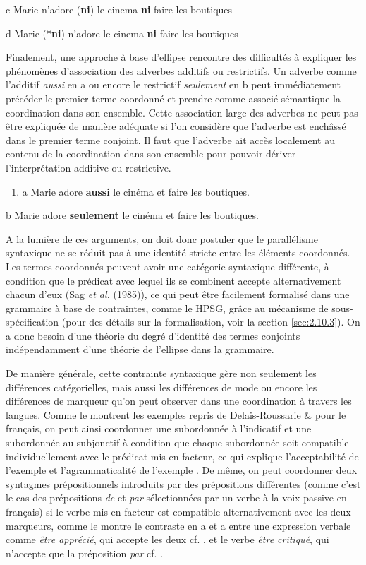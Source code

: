   c  Marie n'adore (\textbf{ni}) le cinema \textbf{ni} faire les boutiques

  d  Marie (*\textbf{ni}) n'adore le cinema \textbf{ni} faire les boutiques

Finalement, une approche à base d'ellipse rencontre des difficultés à expliquer les phénomènes d'association des adverbes additifs ou restrictifs. Un adverbe comme l'additif \textit{aussi} en a ou encore le restrictif \textit{seulement} en b peut immédiatement précéder le premier terme coordonné et prendre comme associé sémantique la coordination dans son ensemble. Cette association large des adverbes ne peut pas être expliquée de manière adéquate si l'on considère que l'adverbe est enchâssé dans le premier terme conjoint. Il faut que l'adverbe ait accès localement au contenu de la coordination dans son ensemble pour pouvoir dériver l'interprétation additive ou restrictive. 


\begin{enumerate}
\item \label{bkm:Ref300521332}a  Marie adore \textbf{aussi} le cinéma et faire les boutiques.


\end{enumerate}
  b  Marie adore \textbf{seulement} le cinéma et faire les boutiques.

A la lumière de ces arguments, on doit donc postuler que le parallélisme syntaxique ne se réduit pas à une identité stricte entre les éléments coordonnés. Les termes coordonnés peuvent avoir une catégorie syntaxique différente, à condition que le prédicat avec lequel ils se combinent accepte alternativement chacun d'eux (Sag \textit{et al.} (1985)), ce qui peut être facilement formalisé dans une grammaire à base de contraintes, comme le HPSG, grâce au mécanisme de sous-spécification (pour des détails sur la formalisation, voir la section \ref{sec:2.10.3}). On a donc besoin d'une théorie du degré d'identité des termes conjoints indépendamment d'une théorie de l'ellipse dans la grammaire.

De manière générale, cette contrainte syntaxique gère non seulement les différences catégorielles, mais aussi les différences de mode ou encore les différences de marqueur qu'on peut observer dans une coordination à travers les langues. Comme le montrent les exemples repris de Delais-Roussarie \& \citet{Mouret2008} pour le français, on peut ainsi coordonner une subordonnée à l'indicatif et une subordonnée au subjonctif à condition que chaque subordonnée soit compatible individuellement avec le prédicat mis en facteur, ce qui explique l'acceptabilité de l'exemple  et l'agrammaticalité de l'exemple . De même, on peut coordonner deux syntagmes prépositionnels introduits par des prépositions différentes (comme c'est le cas des prépositions \textit{de} et \textit{par} sélectionnées par un verbe à la voix passive en français) si le verbe mis en facteur est compatible alternativement avec les deux marqueurs, comme le montre le contraste en a et a entre une expression verbale comme \textit{être apprécié}, qui accepte les deux cf. , et le verbe \textit{être critiqué}, qui n'accepte que la préposition \textit{par} cf. . 


